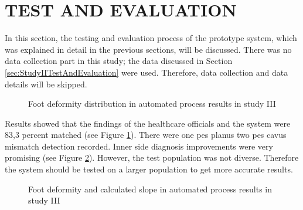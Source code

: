 \section{TEST AND EVALUATION}\label{sec:StudyIIITestAndEvaluation}

In this section, the testing and evaluation process of the prototype system, which was explained in detail in the previous sections, will be discussed. There was no data collection part in this study; the data discussed in Section \ref{sec:StudyIITestAndEvaluation} were used. Therefore, data collection and data details will be skipped.

\begin{figure}[htbp]
\centering
{}
\caption{Foot deformity distribution in automated process results in study III}
\label{fig:StudyIIIFootDeformityAutomatedProcessResults}
\end{figure} 

Results showed that the findings of the healthcare officials and the system were 83,3 percent matched (see Figure \ref{fig:StudyIIIFootDeformityAutomatedProcessResults}). There were one pes planus two pes cavus mismatch detection recorded. Inner side diagnosis improvements were very promising (see Figure \ref{fig:StudyIIISlopeResults}). However, the test population was not diverse. Therefore the system should be tested on a larger population to get more accurate results.

\begin{figure}[htbp]
\centering
{}
\caption{Foot deformity and calculated slope in automated process results in study III}
\label{fig:StudyIIISlopeResults}
\end{figure} 

